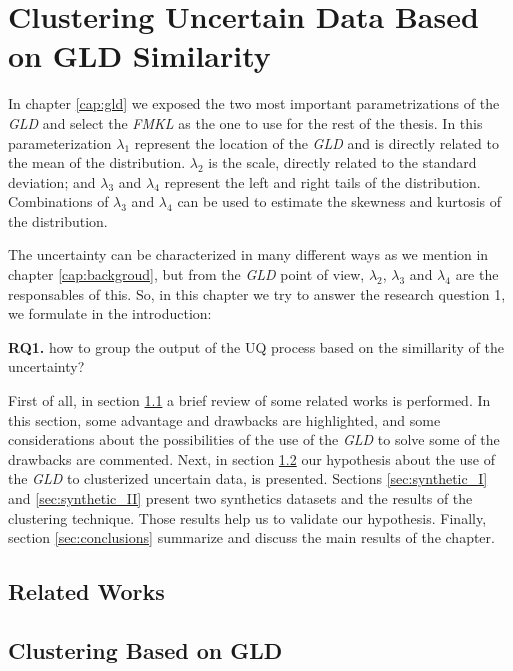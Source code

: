 \chapter[Clustering Uncertain Data Based on GLD Similarity]{Clustering Uncertain Data Based on GLD Similarity}\label{cap:gld_clustering}

In chapter \ref{cap:gld} we exposed the two most important parametrizations of the \textit{GLD} and select the \textit{FMKL} as  the one to use for the rest of the  thesis. In this parameterization $\lambda_{1}$ represent the location of the \textit{GLD} and is directly related to the mean of the distribution. $\lambda_{2}$ is the scale, directly related to the standard deviation; and $\lambda_{3}$ and $\lambda_{4}$ represent the left and right tails of the distribution. Combinations of $\lambda_{3}$ and $\lambda_{4}$ can be used to estimate the skewness and kurtosis of the distribution.

The uncertainty can be characterized in many different ways as we mention in chapter \ref{cap:backgroud}, but from the \textit{GLD} point of view, $\lambda_{2}$, $\lambda_{3}$ and $\lambda_{4}$ are the responsables of this. So, in this chapter we try to answer the research question 1, we formulate in the introduction:

\textbf{RQ1.} how to group the output of the UQ process based on the simillarity of the uncertainty?

First of all, in section \ref{sec:related_works} a brief review of some related works is performed. In this section, some advantage and drawbacks are highlighted, and some considerations about the possibilities of the use of the \textit{GLD} to solve some of the drawbacks are commented. Next, in section \ref{sec:clustering_gld} our hypothesis about the use of the \textit{GLD} to clusterized uncertain data, is presented. Sections \ref{sec:synthetic_I} and \ref{sec:synthetic_II} present two synthetics datasets and the results of the clustering technique. Those results help us to validate our hypothesis. Finally, section \ref{sec:conclusions} summarize and discuss the main results of the chapter.

\section{Related Works}\label{sec:related_works}

\cite{Jiang2011}

\section{Clustering Based on GLD}\label{sec:clustering_gld}

